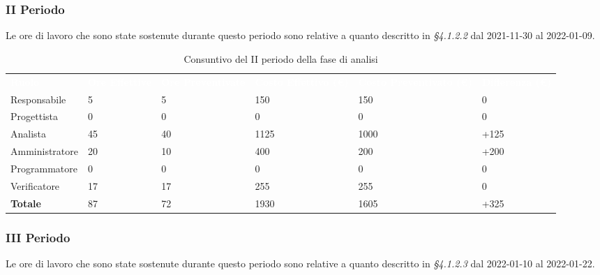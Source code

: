\subsubsection{II Periodo}
Le ore di lavoro che sono state sostenute durante questo periodo sono relative a quanto descritto in \textit{§4.1.2.2} dal 2021-11-30 al 2022-01-09.

\begin{table}[H]
\begin{center}
\renewcommand{\arraystretch}{1.5}
\begin{tabular}{ m{}<{\centering}  m{}<{\centering} m{}<{\centering} m{}<{\centering} m{}<{\centering} m{}<{\centering}}
	\rowcolor{darkblue}
	\textcolor{white}{\textbf{Ruolo}} & \textcolor{white}{\textbf{Ore Effettive}} & \textcolor{white}{\textbf{Ore Preventivate}}&\textcolor{white}{\textbf{Costo Effettivo (\euro) }}&\textcolor{white}{\textbf{Costo Preventivato (\euro)}}&\textcolor{white}{\textbf{Differenza (\euro)}}\\ 

	Responsabile  & 5 & 5 & 150 & 150 & 0\\	
	
	Progettista & 0 & 0 & 0 & 0 & 0\\
	
	Analista & 45 & 40 & 1125 & 1000 & +125\\
	
	Amministratore & 20 & 10 & 400 & 200 & +200\\
	
	Programmatore & 0 & 0 &0 &0 & 0\\
	
	Verificatore & 17 & 17 & 255 & 255 & 0\\
	
	\textbf{Totale} & 87 & 72 & 1930 & 1605 & +325\\
	
\end{tabular}
\caption{Consuntivo del II periodo della fase di analisi}
\end{center}
\end{table}


\subsubsection{III Periodo}
Le ore di lavoro che sono state sostenute durante questo periodo sono relative a quanto descritto in \textit{§4.1.2.3} dal 2022-01-10 al 2022-01-22.

